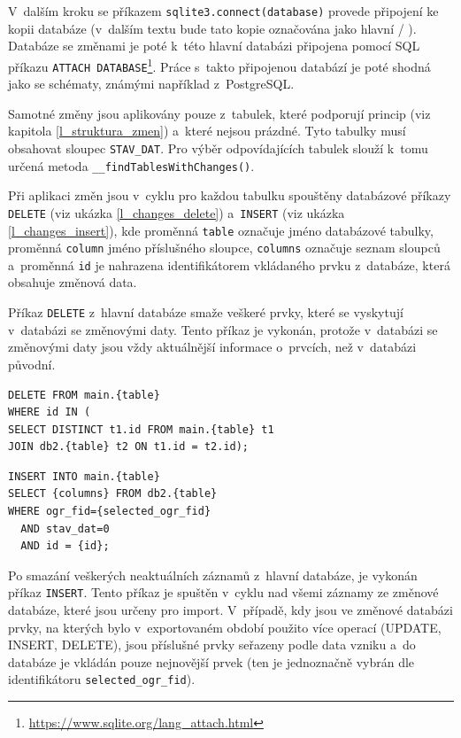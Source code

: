 \documentclass[a4paper,12pt,oneside]{book}
\begin{document}
V~dalším kroku se příkazem \texttt{sqlite3.connect(database)} provede
připojení ke kopii databáze (v~dalším textu bude tato kopie označována
jako hlavní / ). Databáze se změnami je poté k~této hlavní
databázi připojena pomocí SQL příkazu \texttt{ATTACH
  DATABASE}\footnote{\url{https://www.sqlite.org/lang\_attach.html}}. Práce
s~takto připojenou databází je poté shodná jako se schématy, známými
například z~PostgreSQL.

Samotné změny jsou aplikovány pouze z~tabulek, které podporují princip
 (viz kapitola \ref{l_struktura_zmen}) a~které nejsou
prázdné. Tyto tabulky musí obsahovat sloupec \texttt{STAV\_DAT}. Pro
výběr odpovídajících tabulek slouží k~tomu určená metoda
\texttt{\_\_findTablesWithChanges()}.

Při aplikaci změn jsou v~cyklu pro každou tabulku spouštěny databázové
příkazy \texttt{DELETE} (viz ukázka \ref{l_changes_delete})
a~\texttt{INSERT} (viz ukázka \ref{l_changes_insert}), kde proměnná
\texttt{table} označuje jméno databázové tabulky, proměnná
\texttt{column} jméno příslušného sloupce, \texttt{columns} označuje
seznam sloupců a~proměnná \texttt{id} je nahrazena identifikátorem
vkládaného prvku z~databáze, která obsahuje změnová data.

Příkaz \texttt{DELETE} z~hlavní databáze smaže veškeré prvky, které se
vyskytují v~databázi se změnovými daty. Tento příkaz je vykonán,
protože v~databázi se změnovými daty jsou vždy aktuálnější informace
o~prvcích, než v~databázi původní.

{\scriptsize
\begin{lstlisting}[style=sql, caption={Aplikace změn -- příkaz DELETE}, 
		    label=l_changes_delete]
DELETE FROM main.{table}
WHERE id IN (
SELECT DISTINCT t1.id FROM main.{table} t1
JOIN db2.{table} t2 ON t1.id = t2.id);
\end{lstlisting}

\begin{lstlisting}[style=sql, 
		    caption={Aplikace změn -- příkaz INSERT}, 
		    label=l_changes_insert]
INSERT INTO main.{table}
SELECT {columns} FROM db2.{table}
WHERE ogr_fid={selected_ogr_fid}
  AND stav_dat=0
  AND id = {id};
\end{lstlisting}
}

Po smazání veškerých neaktuálních záznamů z~hlavní databáze, je
vykonán příkaz \texttt{INSERT}. Tento příkaz je spuštěn v~cyklu nad
všemi záznamy ze změnové databáze, které jsou určeny pro
import. V~případě, kdy jsou ve změnové databázi prvky, na kterých bylo
v~exportovaném období použito více operací (UPDATE, INSERT, DELETE),
jsou příslušné prvky seřazeny podle data vzniku a~do databáze je
vkládán pouze nejnovější prvek (ten je jednoznačně vybrán dle
identifikátoru \texttt{selected\_ogr\_fid}).
\end{document}
